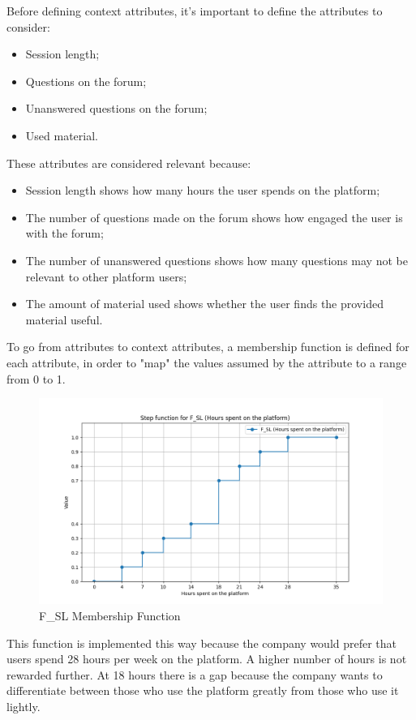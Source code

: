 Before defining context attributes, it's important to define the attributes to consider:
\begin{itemize}
    \item Session length;
    \item Questions on the forum;
    \item Unanswered questions on the forum;
    \item Used material.
\end{itemize}
These attributes are considered relevant because:
\begin{itemize}
    \item Session length shows how many hours the user spends on the platform;
    \item The number of questions made on the forum shows how engaged the user is with the forum;
    \item The number of unanswered questions shows how many questions may not be relevant to other platform users;
    \item The amount of material used shows whether the user finds the provided material useful.
\end{itemize}

To go from attributes to context attributes, a membership function is defined for each attribute, in order to "map" the values assumed by the attribute to a range from 0 to 1.

\begin{figure}[H]
    \centering
    \includegraphics[width=\textwidth]{./assets/plot_F_SL.png}
    \caption{F\_SL Membership Function}
    \label{fig:plot_F_SL}
\end{figure}
This function is implemented this way because the company would prefer that users spend 28 hours per week on the platform. A higher number of hours is not rewarded further. At 18 hours there is a gap because the company wants to differentiate between those who use the platform greatly from those who use it lightly.


